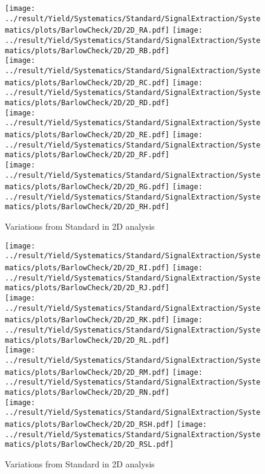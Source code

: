 \newpage
\begin{figure}
	\centering
		\texttt{[image: ../result/Yield/Systematics/Standard/SignalExtraction/Systematics/plots/BarlowCheck/2D/2D\_RA.pdf]}
		\texttt{[image: ../result/Yield/Systematics/Standard/SignalExtraction/Systematics/plots/BarlowCheck/2D/2D\_RB.pdf]}\\
		\texttt{[image: ../result/Yield/Systematics/Standard/SignalExtraction/Systematics/plots/BarlowCheck/2D/2D\_RC.pdf]}
		\texttt{[image: ../result/Yield/Systematics/Standard/SignalExtraction/Systematics/plots/BarlowCheck/2D/2D\_RD.pdf]}\\
		\texttt{[image: ../result/Yield/Systematics/Standard/SignalExtraction/Systematics/plots/BarlowCheck/2D/2D\_RE.pdf]}
		\texttt{[image: ../result/Yield/Systematics/Standard/SignalExtraction/Systematics/plots/BarlowCheck/2D/2D\_RF.pdf]}\\
		\texttt{[image: ../result/Yield/Systematics/Standard/SignalExtraction/Systematics/plots/BarlowCheck/2D/2D\_RG.pdf]}
		\texttt{[image: ../result/Yield/Systematics/Standard/SignalExtraction/Systematics/plots/BarlowCheck/2D/2D\_RH.pdf]}
		\caption{Variations from Standard in 2D analysis}
		\label{}
\end{figure}

\newpage
\begin{figure}
	\centering
		\texttt{[image: ../result/Yield/Systematics/Standard/SignalExtraction/Systematics/plots/BarlowCheck/2D/2D\_RI.pdf]}
		\texttt{[image: ../result/Yield/Systematics/Standard/SignalExtraction/Systematics/plots/BarlowCheck/2D/2D\_RJ.pdf]}\\
		\texttt{[image: ../result/Yield/Systematics/Standard/SignalExtraction/Systematics/plots/BarlowCheck/2D/2D\_RK.pdf]}
		\texttt{[image: ../result/Yield/Systematics/Standard/SignalExtraction/Systematics/plots/BarlowCheck/2D/2D\_RL.pdf]}\\
		\texttt{[image: ../result/Yield/Systematics/Standard/SignalExtraction/Systematics/plots/BarlowCheck/2D/2D\_RM.pdf]}
		\texttt{[image: ../result/Yield/Systematics/Standard/SignalExtraction/Systematics/plots/BarlowCheck/2D/2D\_RN.pdf]}\\
		\texttt{[image: ../result/Yield/Systematics/Standard/SignalExtraction/Systematics/plots/BarlowCheck/2D/2D\_RSH.pdf]}
		\texttt{[image: ../result/Yield/Systematics/Standard/SignalExtraction/Systematics/plots/BarlowCheck/2D/2D\_RSL.pdf]}
		\caption{Variations from Standard in 2D analysis}
		\label{}
\end{figure}

